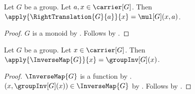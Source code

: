 \begin{proposition}\label{right_translation_apply}
    Let $G$ be a group.
    Let $a,x\in\carrier[G]$.
    Then $\apply{\RightTranslation{G}{a}}{x}=\mul[G](x,a)$.
\end{proposition}
\begin{proof}
    $G$ is a monoid by .
    Follows by .
\end{proof}

\begin{proposition}\label{inverse_map_apply}
    Let $G$ be a group.
    Let $x\in\carrier[G]$.
    Then $\apply{\InverseMap{G}}{x}=\groupInv[G](x)$.
\end{proposition}
\begin{proof}
    $\InverseMap{G}$ is a function by
        .
    $(x,\groupInv[G](x))\in\InverseMap{G}$ by
        .
    Follows by .
\end{proof}

